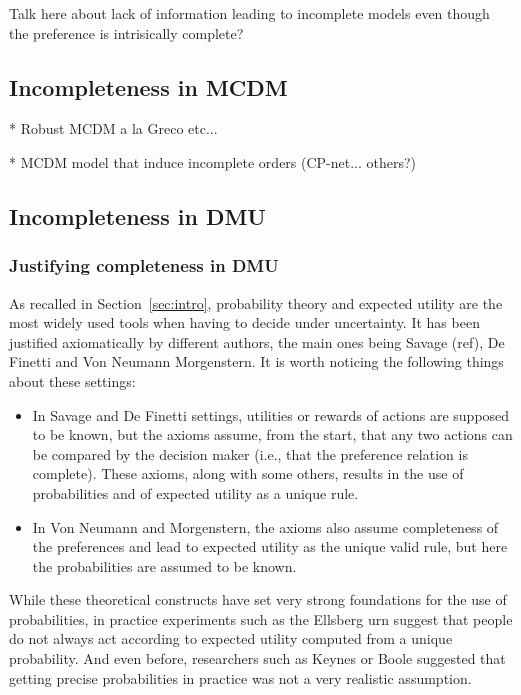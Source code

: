 \documentclass[french, english]{llncs}
\begin{document}
	Talk here about lack of information leading to incomplete models even though the preference is intrisically complete?
	
	\subsection{Incompleteness in MCDM}
	
	* Robust MCDM a la Greco etc...
	
	* MCDM model that induce incomplete orders (CP-net... others?)
	
	\subsection{Incompleteness in DMU}
	
	\subsubsection{Justifying completeness in DMU}
	
	As recalled in Section~\ref{sec:intro}, probability theory and expected utility are the most widely used tools when having to decide under uncertainty. It has been justified axiomatically by different authors, the main ones being Savage (ref), De Finetti and Von Neumann Morgenstern. It is worth noticing the following things about these settings:
	\begin{itemize}
		\item In Savage and De Finetti settings, utilities or rewards of actions are supposed to be known, but the axioms assume, from the start, that any two actions can be compared by the decision maker (i.e., that the preference relation is complete). These axioms, along with some others, results in the use of probabilities and of expected utility as a unique rule. 
		\item In Von Neumann and Morgenstern,  the axioms also assume completeness of the preferences and lead to expected utility as the unique valid rule, but here the probabilities are assumed to be known.
	\end{itemize}
	While these theoretical constructs have set very strong foundations for the use of probabilities, in practice experiments such as the Ellsberg urn suggest that people do not always act according to expected utility computed from a unique probability. And even before, researchers such as Keynes or Boole suggested that getting precise probabilities in practice was not a very realistic assumption. 
	
\end{document}

